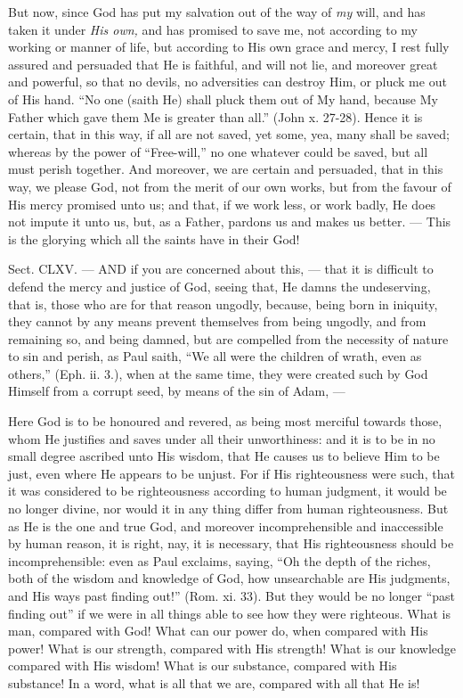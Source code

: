 But now, since God has put my salvation out of the way of \emph{my }will, and has taken it under \emph{His own, }and has promised to save me, not according to my working or manner of life, but according to His own grace and mercy, I rest fully assured and persuaded that He is faithful, and will not lie, and moreover great and powerful, so that no devils, no adversities can destroy Him, or pluck me out of His hand. “No one (saith He) shall pluck them out of My hand, because My Father which gave them Me is greater than all.” (John x. 27-28). Hence it is certain, that in this way, if all are not saved, yet some, yea, many shall be saved; whereas by the power of “Free-will,” no one whatever could be saved, but all must perish together. And moreover, we are certain and persuaded, that in this way, we please God, not from the merit of our own works, but from the favour of His mercy promised unto us; and that, if we work less, or work badly, He does not impute it unto us, but, as a Father, pardons us and makes us better. — This is the glorying which all the saints have in their God!


Sect. CLXV. — AND if you are concerned about this, — that it is difficult to defend the mercy and justice of God, seeing that, He damns the undeserving, that is, those who are for that reason ungodly, because, being born in iniquity, they cannot by any means prevent themselves from being ungodly, and from remaining so, and being damned, but are compelled from the necessity of nature to sin and perish, as Paul saith, “We all were the children of wrath, even as others,” (Eph. ii. 3.), when at the same time, they were created such by God Himself from a corrupt seed, by means of the sin of Adam, —

Here God is to be honoured and revered, as being most merciful towards those, whom He justifies and saves under all their unworthiness: and it is to be in no small degree ascribed unto His wisdom, that He causes us to believe Him to be just, even where He appears to be unjust. For if His righteousness were such, that it was considered to be righteousness according to human judgment, it would be no longer divine, nor would it in any thing differ from human righteousness. But as He is the one and true God, and moreover incomprehensible and inaccessible by human reason, it is right, nay, it is necessary, that His righteousness should be incomprehensible: even as Paul exclaims, saying, “Oh the depth of the riches, both of the wisdom and knowledge of God, how unsearchable are His judgments, and His ways past finding out!” (Rom. xi. 33). But they would be no longer “past finding out” if we were in all things able to see how they were righteous. What is man, compared with God! What can our power do, when compared with His power! What is our strength, compared with His strength! What is our knowledge compared with His wisdom! What is our substance, compared with His substance! In a word, what is all that we are, compared with all that He is!

